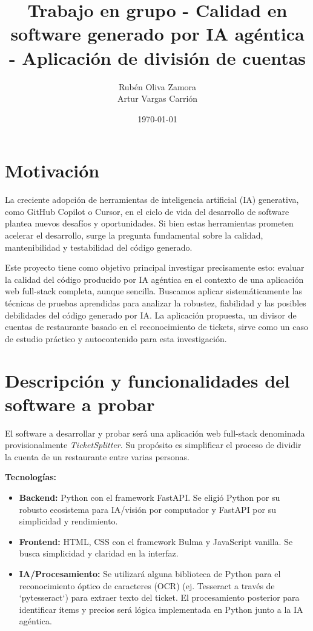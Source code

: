 \documentclass[a4paper, 11pt]{article}
\title{Trabajo en grupo - Calidad en software generado por IA agéntica - Aplicación de división de cuentas}
\author{
    Rubén Oliva Zamora \\
    Artur Vargas Carrión
}
\date{\today} %
\begin{document}
\maketitle %


\section{Motivación}

La creciente adopción de herramientas de inteligencia artificial (IA) generativa, como GitHub Copilot o Cursor, en el ciclo de vida del desarrollo de software plantea nuevos desafíos y oportunidades. Si bien estas herramientas prometen acelerar el desarrollo, surge la pregunta fundamental sobre la calidad, mantenibilidad y testabilidad del código generado.

Este proyecto tiene como objetivo principal investigar precisamente esto: evaluar la calidad del código producido por IA agéntica en el contexto de una aplicación web full-stack completa, aunque sencilla. Buscamos aplicar sistemáticamente las técnicas de pruebas aprendidas para analizar la robustez, fiabilidad y las posibles debilidades del código generado por IA. La aplicación propuesta, un divisor de cuentas de restaurante basado en el reconocimiento de tickets, sirve como un caso de estudio práctico y autocontenido para esta investigación.

\section{Descripción y funcionalidades del software a probar}

El software a desarrollar y probar será una aplicación web full-stack denominada provisionalmente \textit{TicketSplitter}. Su propósito es simplificar el proceso de dividir la cuenta de un restaurante entre varias personas.

\textbf{Tecnologías:}
\begin{itemize}
    \item \textbf{Backend:} Python con el framework FastAPI. Se eligió Python por su robusto ecosistema para IA/visión por computador y FastAPI por su simplicidad y rendimiento.
    \item \textbf{Frontend:} HTML, CSS con el framework Bulma y JavaScript vanilla. Se busca simplicidad y claridad en la interfaz. %
    \item \textbf{IA/Procesamiento:} Se utilizará alguna biblioteca de Python para el reconocimiento óptico de caracteres (OCR) (ej. Tesseract a través de `pytesseract`) para extraer texto del ticket. El procesamiento posterior para identificar ítems y precios será lógica implementada en Python junto a la IA agéntica.
\end{itemize}
\end{document}
